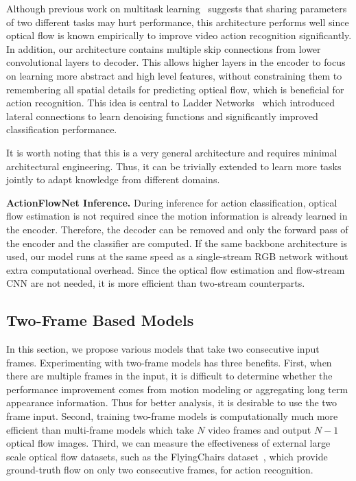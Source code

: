 \documentclass[10pt,twocolumn,letterpaper]{article}
\begin{document}
Although previous work on multitask learning~\cite{misraSGH16} suggests that sharing parameters of two different tasks may hurt performance, this architecture performs well since optical flow is known empirically to improve video action recognition significantly.
In addition, our architecture contains multiple skip connections from lower convolutional layers to decoder.
This allows higher layers in the encoder to focus on learning more abstract and high level features, without constraining them to remembering all spatial details for predicting optical flow, which is beneficial for action recognition.
This idea is central to Ladder Networks~\cite{rasmusVHBR15} which introduced lateral connections to learn denoising functions and significantly improved classification performance.

It is worth noting that this is a very general architecture and requires minimal architectural engineering.
Thus, it can be trivially extended to learn more tasks jointly to adapt knowledge from different domains.

\noindent\textbf{ActionFlowNet Inference.}
During inference for action classification, optical flow estimation is not required since the motion information is already learned in the encoder. Therefore, the decoder can be removed and only the forward pass of the encoder and the classifier are computed. If the same backbone architecture is used, our model runs at the same speed as a single-stream RGB network without extra computational overhead. Since the optical flow estimation and flow-stream CNN are not needed, it is more efficient than two-stream counterparts.

\subsection{Two-Frame Based Models}\label{sec:models}
In this section, we propose various models that take two consecutive input frames.
Experimenting with two-frame models has three benefits.
First, when there are multiple frames in the input, it is difficult to determine whether the performance improvement comes from motion modeling or aggregating long term appearance information.
Thus for better analysis, it is desirable to use the two frame input.
Second, training two-frame models is computationally much more efficient than multi-frame models which take $N$ video frames and output $N-1$ optical flow images.
Third, we can measure the effectiveness of external large scale optical flow datasets, such as the FlyingChairs dataset~\cite{FischerDIHHGSCB15}, which provide ground-truth flow on only two consecutive frames, for action recognition.
\end{document}
